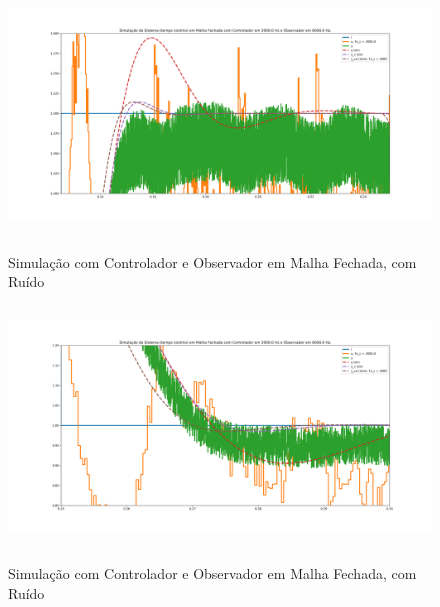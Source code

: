 \documentclass[
	12pt,				%
	article,			%
	openright,			%
	oneside,
	a4paper,			%
	chapter=TITLE,		%
	section=TITLE,		%
	english,			%
	french,				%
	spanish,			%
	brazil,				%
]{abntex2}
\begin{document}
\begin{apendicesenv}
        	\begin{figure}[htbp]
                	\centering
                	\caption{Simulação com Controlador e Observador em Malha Fechada, com Ruído}
                	\includegraphics[width=\textwidth,height=240px,keepaspectratio]{imgs/step_response_closedloop_observer_zoom_stepup_noise.png}
                	\label{fig-step_response_closedloop_observer_zoom_stepup_noise}
        	\end{figure}
        	
        	\begin{figure}[htbp]
                	\centering
                	\caption{Simulação com Controlador e Observador em Malha Fechada, com Ruído}
                	\includegraphics[width=\textwidth,height=240px,keepaspectratio]{imgs/step_response_closedloop_observer_zoom_stepdown_noise.png}
                	\label{fig-step_response_closedloop_observer_zoom_stepdown_noise}
        	\end{figure}
            	

\end{apendicesenv}
\end{document}
